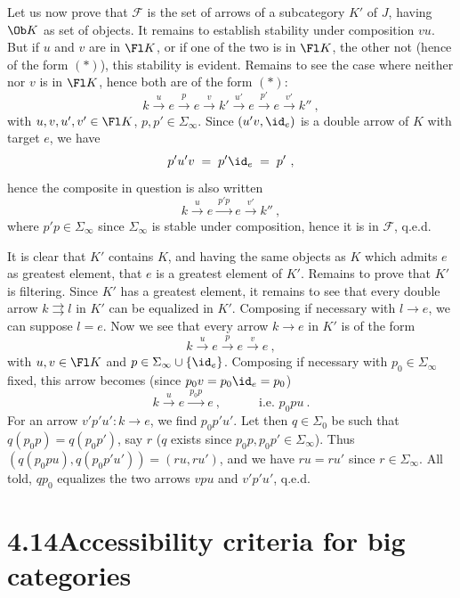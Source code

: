 Let us now prove that $\mathcal{F}$ is the set of arrows of a subcategory $K'$ of $J$, having $\Ob K$ as set of objects. It remains to establish stability under composition $vu$. But if $u$ and $v$ are in $\Fl K$, or if one of the two is in $\Fl K$, the other not (hence of the form $(*)$), this stability is evident. Remains to see the case where neither nor $v$ is in $\Fl K$, hence both are of the form $(*)$:
\[
k \xrightarrow{\ u\ } e \xrightarrow{\ p\ } e \xrightarrow{\ v\ } k' \xrightarrow{\ u'\ } e \xrightarrow{\ p'\ } e \xrightarrow{\ v'\ } k''\ ,
\]
with $u,v,u',v'\in\Fl K$, $p,p'\in\Sigma_\infty$. Since $(u'v,\id_e)$ is a double arrow of
$K$ with target $e$, we have
\[
p'u'v \;=\; p'\id_e \;=\; p'\ ,
\]
hence the composite in question is also written
\[
k \xrightarrow{\ u\ } e \xrightarrow{\ p'p\ } e \xrightarrow{\ v'\ } k''\ ,
\]
where $p'p\in\Sigma_\infty$ since $\Sigma_\infty$ is stable under composition, hence it is in $\mathcal{F}$, q.e.d.

It is clear that $K'$ contains $K$, and having the same objects as $K$ which admits $e$ as greatest element, that $e$ is a greatest element of $K'$. Remains to prove that $K'$ is filtering. Since $K'$ has a greatest element, it remains to see that every double arrow $k\rightrightarrows l$ in $K'$ can be equalized in $K'$. Composing if necessary with $l\longrightarrow e$, we can suppose $l=e$. Now we see that every arrow $k\longrightarrow e$ in $K'$ is of the form
\[
k \xrightarrow{\ u\ } e \xrightarrow{\ p\ } e \xrightarrow{\ v\ } e\ ,
\]
with $u,v\in\Fl K$ and $p\in\Sigma_\infty\cup\{\id_e\}$. Composing if necessary with $p_0\in\Sigma_\infty$ fixed, this arrow becomes (since $p_0v=p_0\id_e=p_0$)
\[
k \xrightarrow{\ u\ } e \xrightarrow{\ p_0p\ } e\ , \qquad\quad \text{i.e. } p_0pu\ .
\]
For an arrow $v'p'u' : k\longrightarrow e$, we find $p_0p'u'$. Let then $q\in\Sigma_0$ be such that $q(p_0p)=q(p_0p')$, say $r$ ($q$ exists since $p_0p,p_0p'\in\Sigma_\infty$). Thus $(q(p_0pu),q(p_0p'u'))=(ru,ru')$, and we have $ru=ru'$ since $r\in\Sigma_\infty$. All told, $qp_0$ equalizes the two arrows $vpu$ and $v'p'u'$, q.e.d.


\section*{4.14\quad Accessibility criteria for big categories}

